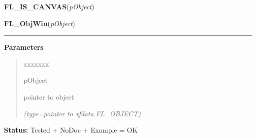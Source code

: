     \label{xformslib:library:FL_IS_CANVAS}

    \vspace{0.5ex}

\hspace{.8\funcindent}\begin{boxedminipage}{\funcwidth}

    \raggedright \textbf{FL\_IS\_CANVAS}(\textit{pObject})

\setlength{\parskip}{2ex}
\setlength{\parskip}{1ex}
    \end{boxedminipage}

    \label{xformslib:library:FL_ObjWin}

    \vspace{0.5ex}

\hspace{.8\funcindent}\begin{boxedminipage}{\funcwidth}

    \raggedright \textbf{FL\_ObjWin}(\textit{pObject})

    \vspace{-1.5ex}

    \rule{\textwidth}{0.5\fboxrule}
\setlength{\parskip}{2ex}
\setlength{\parskip}{1ex}
      \textbf{Parameters}
      \vspace{-1ex}

      \begin{quote}
        \begin{Ventry}{xxxxxxx}

          \item[pObject]

          pointer to object

            {\it (type=pointer to xfdata.FL\_OBJECT)}

        \end{Ventry}

      \end{quote}

\textbf{Status:} Tested + NoDoc + Example = OK



    \end{boxedminipage}

    \label{xformslib:library:fl_get_real_object_window}

